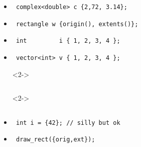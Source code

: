 \begin{frame}[fragile]
\begin{columns}[t]
\begin{itemize}
\item<2->{\scriptsize\begin{verbatim} complex<double> c {2,72, 3.14}; \end{verbatim}}
\item<2->{\scriptsize\begin{verbatim} rectangle w {origin(), extents()};\end{verbatim}}
\item<2->{\scriptsize\begin{verbatim} int         i { 1, 2, 3, 4 }; \end{verbatim}}
\item<2->{\scriptsize\begin{verbatim} vector<int> v { 1, 2, 3, 4 };  \end{verbatim}}
\item[] <2->{\scriptsize\begin{verbatim} \end{verbatim}}
\item[] <2->{\scriptsize\begin{verbatim} \end{verbatim}}
\item<3->{\scriptsize\begin{verbatim} int i = {42}; // silly but ok\end{verbatim}}
\item<4->{\scriptsize\begin{verbatim} draw_rect({orig,ext});  \end{verbatim}}
\end{itemize}

\end{columns}
\end{frame}


